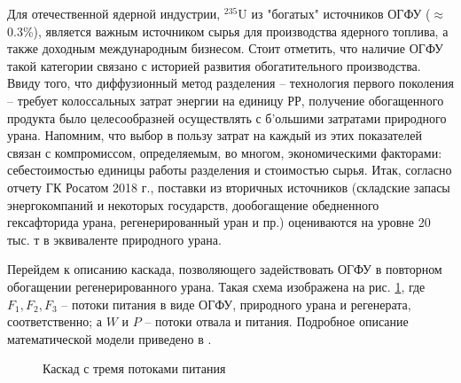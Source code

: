 Для отечественной ядерной индустрии, $^{235}$U из "богатых" источников ОГФУ ($\approx$0.3\%), является важным источником сырья для производства ядерного топлива, а также доходным международным бизнесом. 
Стоит отметить, что наличие ОГФУ такой категории связано с историей развития обогатительного производства. Ввиду того, что диффузионный метод разделения -- технология первого поколения -- требует колоссальных затрат энергии на единицу РР, получение обогащенного продукта было целесообразней осуществлять с б'ольшими затратами природного урана.
Напомним, что выбор в пользу затрат на каждый из этих показателей связан с компромиссом, определяемым, во многом, экономическими факторами: себестоимостью единицы работы разделения и стоимостью сырья. 
Итак, согласно отчету ГК Росатом 2018 г., поставки из вторичных источников (складские запасы энергокомпаний и некоторых государств, дообогащение обедненного гексафторида урана, регенерированный уран и пр.) оцениваются на уровне 20 тыс. т в эквиваленте природного урана.

Перейдем к описанию каскада, позволяющего задействовать ОГФУ в повторном обогащении регенерированного урана.
Такая схема изображена на рис. \ref{fig:3_inputs}, где $F_{1}, F_{2}, F_{3}$ -- потоки питания в виде ОГФУ, природного урана и регенерата, соответственно; а $W$ и $P$ -- потоки отвала и питания.
Подробное описание математической модели приведено в \cite{smirnovEnrichmentRegeneratedUranium2014}.

\begin{figure}[ht]
  \caption{Каскад с тремя потоками питания}\label{fig:3_inputs}
\end{figure}

